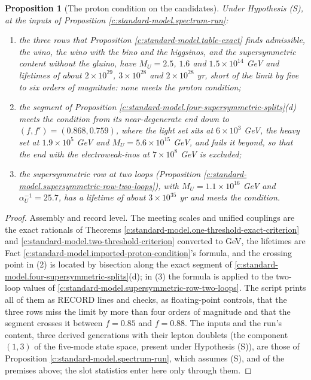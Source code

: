 \documentclass[11pt]{article}
\newtheorem{proposition}[theorem]{Proposition}
\theoremstyle{definition}
\theoremstyle{plain}
\newcommand{\changedmark}[2]{\marginpar{\raggedright\scriptsize\color{#1}#2}}
\begin{document}
\begin{proposition}[The proton condition on the candidates]\label{c:standard-model.proton-condition-candidates}
\changedmark{gray}{reworded}
Under Hypothesis (S), at the inputs of Proposition \ref{c:standard-model.spectrum-run}:
\begin{enumerate}
\item[(1)] the three rows that Proposition \ref{c:standard-model.table-exact} finds admissible, the wino, the wino with the bino and the higgsinos, and the supersymmetric content without the gluino, have $M_{U} = 2.5$, $1.6$ and $1.5 \times 10^{14}$ GeV and lifetimes of about $2 \times 10^{29}$, $3 \times 10^{28}$ and $2 \times 10^{28}$ yr, short of the limit by five to six orders of magnitude: none meets the proton condition;
\item[(2)] the segment of Proposition \ref{c:standard-model.four-supersymmetric-splits}(d) meets the condition from its near-degenerate end down to $(f, f') = (0.868, 0.759)$, where the light set sits at $6 \times 10^{3}$ GeV, the heavy set at $1.9 \times 10^{5}$ GeV and $M_{U} = 5.6 \times 10^{15}$ GeV, and fails it beyond, so that the end with the electroweak-inos at $7 \times 10^{8}$ GeV is excluded;
\item[(3)] the supersymmetric row at two loops (Proposition \ref{c:standard-model.supersymmetric-row-two-loops}), with $M_{U} = 1.1 \times 10^{16}$ GeV and $\alpha_{U}^{-1} = 25.7$, has a lifetime of about $3 \times 10^{35}$ yr and meets the condition.
\end{enumerate}
\end{proposition}
\begin{proof}
Assembly and record level. The meeting scales and unified couplings are the exact rationals of Theorems \ref{c:standard-model.one-threshold-exact-criterion} and \ref{c:standard-model.two-threshold-criterion} converted to GeV, the lifetimes are Fact \ref{c:standard-model.imported-proton-condition}'s formula, and the crossing point in (2) is located by bisection along the exact segment of \ref{c:standard-model.four-supersymmetric-splits}(d); in (3) the formula is applied to the two-loop values of \ref{c:standard-model.supersymmetric-row-two-loops}. The script prints all of them as RECORD lines and checks, as floating-point controls, that the three rows miss the limit by more than four orders of magnitude and that the segment crosses it between $f = 0.85$ and $f = 0.88$. The inputs and the run's content, three derived generations with their lepton doublets (the component $(1,3)$ of the five-mode state space, present under Hypothesis (S)), are those of Proposition \ref{c:standard-model.spectrum-run}, which assumes (S), and of the premises above; the slot statistics enter here only through them.

\end{proof}
\end{document}
